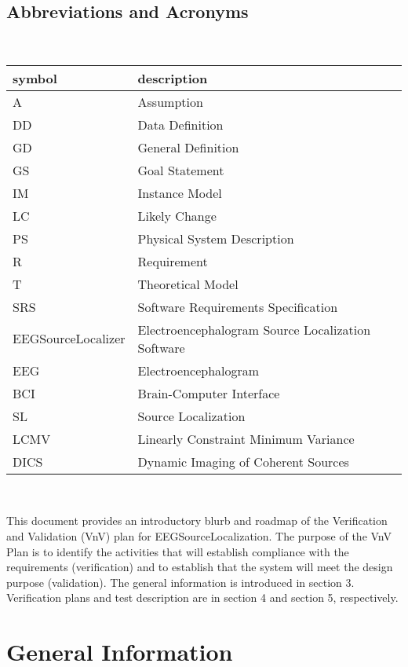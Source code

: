 \documentclass[12pt, titlepage]{article}
\renewcommand{\progname}{EEGSourceLocalization}
\begin{document}
\subsection{Abbreviations and Acronyms}
~\newline
\renewcommand{\arraystretch}{1.2}
\begin{tabular}{l l} 
  \toprule		
  \textbf{symbol} & \textbf{description}\\
  \midrule 
  A & Assumption\\
  DD & Data Definition\\
  GD & General Definition\\
  GS & Goal Statement\\
  IM & Instance Model\\
  LC & Likely Change\\
  PS & Physical System Description\\
  R & Requirement\\
   T & Theoretical Model\\
  SRS & Software Requirements Specification\\
 EEGSourceLocalizer & Electroencephalogram Source Localization Software\\ 
  EEG & Electroencephalogram \\
  BCI & Brain-Computer Interface\\
  SL & Source Localization \\
  LCMV & Linearly Constraint Minimum Variance \\
  DICS & Dynamic Imaging of Coherent Sources\\

  \bottomrule
\end{tabular}\\


\newpage


This document provides an introductory blurb and roadmap of the Verification and 
Validation (VnV) plan for \progname{}. The purpose of the VnV Plan is to identify the activities that will establish compliance with the requirements (verification) and to establish that the system will meet the design purpose (validation). The general information is introduced in section 3.  Verification plans and test description are in section 4 and section 5, respectively. 


\section{General Information}
\end{document}
